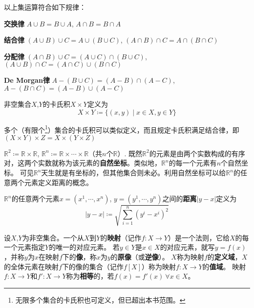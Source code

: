 \begin{theorem}
	以上集运算符合如下规律：

	\textbf{交换律} $A \cup B = B \cup A$, $A \cap B = B \cap A$

	\textbf{结合律} $(A \cup B) \cup C = A \cup (B \cup C)$, $(A \cap B) \cap C = A \cap (B \cap C)$

	\textbf{分配律} $(A \cap B) \cup C = (A \cup C) \cap (B \cup C)$, $(A \cup B) \cap C = (A \cap C) \cup (B \cap C)$

	\textbf{De Morgan律} $A - (B \cup C) = (A - B) \cap (A - C)$, $A - (B \cap C) = (A - B) \cup (A - C)$

\end{theorem}

\begin{definition}
	非空集合$X$,$Y$的卡氏积$X \times Y$定义为
	$$X \times Y \coloneq \{(x, y) \mid x \in X, y \in Y\}$$
\end{definition}
多个（有限个\footnote{无限多个集合的卡氏积也可定义，但已超出本书范围。}）集合的卡氏积可以类似定义，而且规定卡氏积满足结合律，即$(X \times Y) \times Z = X \times (Y \times Z)$

\begin{example}
	$\mathbb{R}^2 \coloneq \mathbb{R} \times \mathbb{R}$, $\mathbb{R}^n \coloneq \mathbb{R} \times \cdots \times \mathbb{R}$（共$n$个$\mathbb{R}$）.
	既然$\mathbb{R}^2$的元素是由两个实数构成的有序对，这两个实数就称为该元素的\textbf{自然坐标}。类似地，$\mathbb{R}^n$的每一个元素有$n$个自然坐标。
	可见$\mathbb{R}^n$天生就是有坐标的，但其他集合则未必。利用自然坐标可以给$\mathbb{R}^n$的任意两个元素定义距离的概念。
\end{example}

\begin{definition}
	$\mathbb{R}^n$的任意两个元素$x = (x^1, \cdots, x^n)$, $y = (y^1, \cdots, y^n)$之间的\textbf{距离}$|y - x|$定义为
	$$|y - x| \coloneq \sqrt{\sum^n_{i = 1}(y^i - x^i)^2}$$
\end{definition}

\begin{definition}
	设$X$,$Y$为非空集合。一个从$X$到$Y$的\textbf{映射}（记作$f \colon X \to Y$）是一个法则，它给$X$的每一个元素指定$Y$的唯一的对应元素。
	若$y \in Y$是$x \in X$的对应元素，就写$y = f(x)$，并称$y$为$x$在映射$f$下的\textbf{像}，称$x$为$y$的\textbf{原像}（或\textbf{逆像}）。
	$X$称为映射$f$的\textbf{定义域}，$X$的全体元素在映射$f$下的像的集合（记作$f[X]$）称为映射$f \colon X \to Y$的\textbf{值域}。
	映射$f \colon X \to Y$和$f' \colon X \to Y$称为\textbf{相等}的，若$f(x) = f'(x) ~ \forall x \in X$。
\end{definition}

